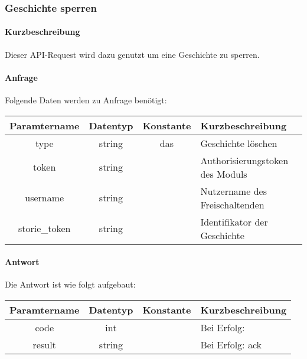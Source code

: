 \subsubsection{Geschichte sperren}
\paragraph{Kurzbeschreibung}Dieser API-Request wird dazu genutzt um eine Geschichte zu sperren.
\paragraph{Anfrage}Folgende Daten werden zu Anfrage benötigt:
\begin{table}[H]
	\begin{tabular}{|c|c|c|p{6.5cm}|}
		\hline
		\textbf{Paramtername} & \textbf{Datentyp} & \textbf{Konstante} & \textbf{Kurzbeschreibung}                                                                                               \\ \hline
		type                & string            & das                & Geschichte löschen \\ \hline
		token               & string            &                    & Authorisierungstoken des Moduls \\ \hline
		username            & string            &                    & Nutzername des Freischaltenden \\ \hline
		storie\_token       & string            &                    & Identifikator der Geschichte \\ \hline
	\end{tabular}
\end{table}
\paragraph{Antwort}Die Antwort ist wie folgt aufgebaut:
\begin{table}[H]
	\begin{tabular}{|c|c|c|p{6.5cm}|}
		\hline
		\textbf{Paramtername} & \textbf{Datentyp} & \textbf{Konstante} & \textbf{Kurzbeschreibung}            \\ \hline                
		code                & int              &                 & Bei Erfolg: {\glqq 0\grqq} \\ \hline
		result              & string           &                 & Bei Erfolg: {\glqq ack\grqq} \\ \hline
	\end{tabular}
\end{table}
